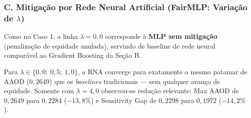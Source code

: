\subsubsection{C. Mitigação por Rede Neural Artificial (FairMLP: Variação de $\lambda$)}

Como no Caso 1, a linha $\lambda = 0,0$ corresponde à \textbf{MLP sem mitigação} (penalização de equidade anulada), servindo de baseline de rede neural comparável ao Gradient Boosting da Seção B.

\begin{table}[H]
    \centering
    \caption{COMPAS: Efeito da penalização de viés na FairMLP (lambda sweep).}
    \vspace{2mm}
    \label{tab:compas_lambda_sweep}
\end{table}

Para $\lambda \in \{0,0;\ 0,5;\ 1,0\}$, a RNA converge para exatamente o mesmo patamar de AAOD ($0,2649$) que os \textit{baselines} tradicionais --- sem qualquer avanço de equidade. Somente com $\lambda = 4,0$ observou-se redução relevante: Max AAOD de $0,2649$ para $0,2284$ ($-13,8\%$) e Sensitivity Gap de $0,2298$ para $0,1972$ ($-14,2\%$).

